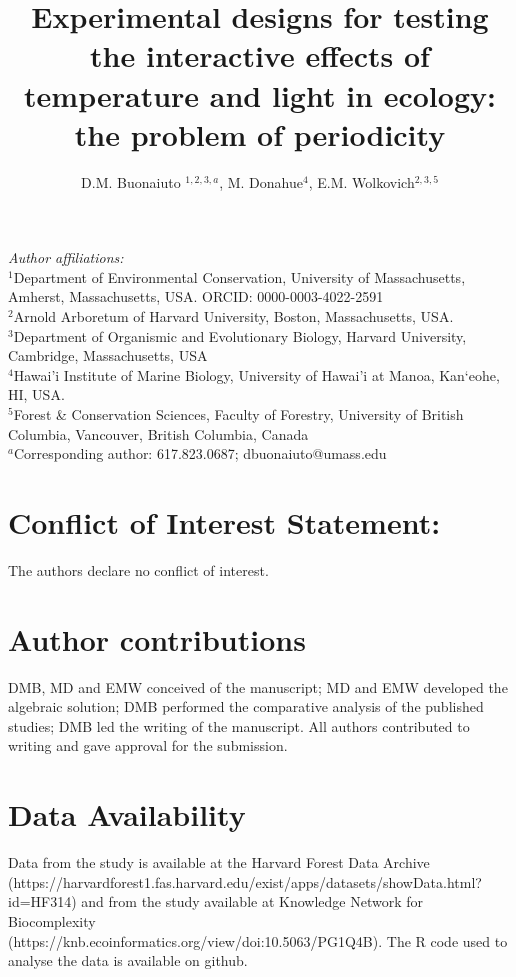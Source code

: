 \documentclass[11pt]{article}
\title{Experimental designs for testing the interactive effects of temperature and light in ecology: the problem of periodicity }
\date{}
\author{D.M. Buonaiuto $^{1,2,3,a}$, M. Donahue$^{4}$, E.M. Wolkovich$^{2,3,5}$}
\begin{document}
\maketitle
\noindent \emph{Author affiliations:}\\
\noindent $^1$Department of Environmental Conservation, University of Massachusetts, Amherst, Massachusetts, USA. ORCID: 0000-0003-4022-2591\\
\noindent $^2$Arnold Arboretum of Harvard University, Boston, Massachusetts, USA.\\
$^3$Department of Organismic and Evolutionary Biology, Harvard University, Cambridge, Massachusetts, USA \\
$^4$Hawai'i Institute of Marine Biology, University of Hawai'i at Manoa, Kan‘eohe, HI, USA.\\
$^5$Forest \& Conservation Sciences, Faculty of Forestry, University of British Columbia, Vancouver, British Columbia, Canada\\
$^a$Corresponding author: 617.823.0687; dbuonaiuto@umass.edu\\

\section*{Conflict of Interest Statement:}
The authors declare no conflict of interest.

\section*{Author contributions}
DMB, MD and EMW conceived of the manuscript; MD and EMW developed the algebraic solution; DMB performed the comparative analysis of the published studies; DMB led the writing of the manuscript. All authors contributed to writing and gave approval for the submission.

\section*{Data Availability}
Data from the \cite{Flynn2018} study is available at the Harvard Forest Data Archive (https://harvardforest1.fas.harvard.edu/exist/apps/datasets/showData.html?id=HF314) and from the \citet{Buonaiuto:2021ug} study available at Knowledge Network for Biocomplexity\\ (https://knb.ecoinformatics.org/view/doi:10.5063/PG1Q4B). The R code used to analyse the data is available on github.
\end{document}
